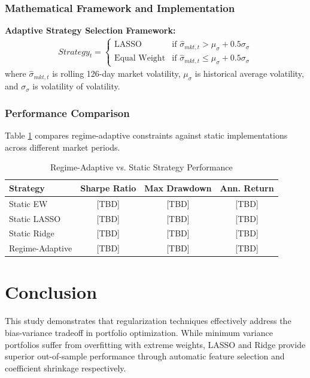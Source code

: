\documentclass[12pt]{article}
\begin{document}
\subsubsection{Mathematical Framework and Implementation}
\textbf{Adaptive Strategy Selection Framework:}
\begin{align}
Strategy_t = \begin{cases}
\text{LASSO} & \text{if } \hat{\sigma}_{mkt,t} > \mu_{\sigma} + 0.5\sigma_{\sigma} \\
\text{Equal Weight} & \text{if } \hat{\sigma}_{mkt,t} \leq \mu_{\sigma} + 0.5\sigma_{\sigma}
\end{cases}
\end{align}
where $\hat{\sigma}_{mkt,t}$ is rolling 126-day market volatility, $\mu_{\sigma}$ is historical average volatility, and $\sigma_{\sigma}$ is volatility of volatility.

\subsubsection{Performance Comparison}
Table \ref{tab:regime_performance} compares regime-adaptive constraints against static implementations across different market periods.

\begin{table}[h]
\centering
\caption{Regime-Adaptive vs. Static Strategy Performance}
\label{tab:regime_performance}
\begin{tabular}{lccc}
\hline
Strategy & Sharpe Ratio & Max Drawdown & Ann. Return \\
\hline
Static EW & [TBD] & [TBD] & [TBD] \\
Static LASSO & [TBD] & [TBD] & [TBD] \\
Static Ridge & [TBD] & [TBD] & [TBD] \\
Regime-Adaptive & [TBD] & [TBD] & [TBD] \\
\hline
\end{tabular}
\end{table}

\section{Conclusion}

This study demonstrates that regularization techniques effectively address the bias-variance tradeoff in portfolio optimization. While minimum variance portfolios suffer from overfitting with extreme weights, LASSO and Ridge provide superior out-of-sample performance through automatic feature selection and coefficient shrinkage respectively.
\end{document}
